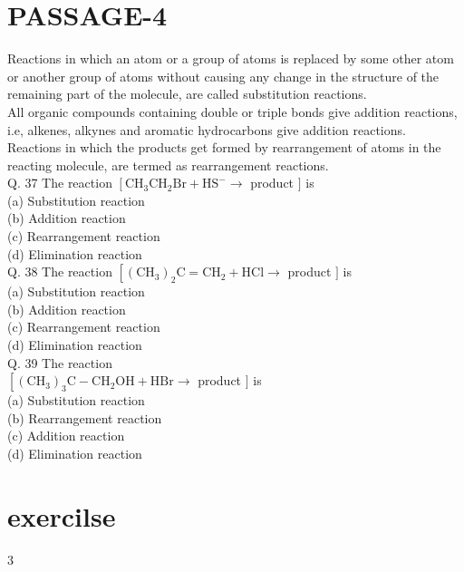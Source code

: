 \documentclass[10pt]{article}
\begin{document}
\section*{PASSAGE-4}
Reactions in which an atom or a group of atoms is replaced by some other atom or another group of atoms without causing any change in the structure of the remaining part of the molecule, are called substitution reactions.\\
All organic compounds containing double or triple bonds give addition reactions, i.e, alkenes, alkynes and aromatic hydrocarbons give addition reactions.\\
Reactions in which the products get formed by rearrangement of atoms in the reacting molecule, are termed as rearrangement reactions.\\
Q. 37 The reaction $\left[\mathrm{CH}_{3} \mathrm{CH}_{2} \mathrm{Br}+\mathrm{HS}^{-} \longrightarrow\right.$ product $]$ is\\
(a) Substitution reaction\\
(b) Addition reaction\\
(c) Rearrangement reaction\\
(d) Elimination reaction\\
Q. 38 The reaction $\left[\left(\mathrm{CH}_{3}\right)_{2} \mathrm{C}=\mathrm{CH}_{2}+\mathrm{HCl} \longrightarrow\right.$ product $]$ is\\
(a) Substitution reaction\\
(b) Addition reaction\\
(c) Rearrangement reaction\\
(d) Elimination reaction\\
Q. 39 The reaction\\
$\left[\left(\mathrm{CH}_{3}\right)_{3} \mathrm{C}-\mathrm{CH}_{2} \mathrm{OH}+\mathrm{HBr} \longrightarrow\right.$ product $]$ is\\
(a) Substitution reaction\\
(b) Rearrangement reaction\\
(c) Addition reaction\\
(d) Elimination reaction

\section*{exercilse}
3
\end{document}

